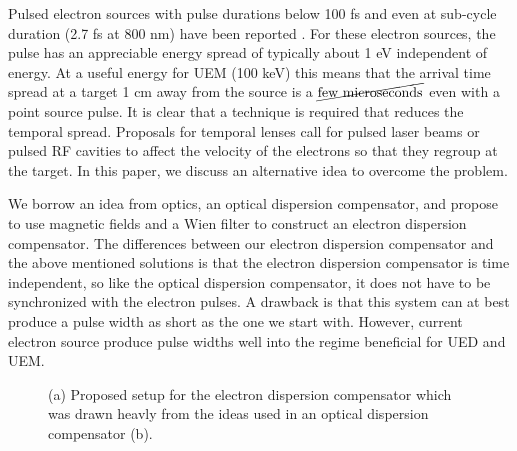 \documentclass[12pt,letterpaper]{article}
\begin{document}
Pulsed electron sources with pulse durations below 100 fs \cite{Bat} and even at sub-cycle duration (2.7 fs at 800 nm) have been reported \cite{Kasevich,Hommelhof}.  
For these electron sources, the pulse has an appreciable energy spread of typically about 1 eV independent of energy. 
At a useful energy for UEM (100 keV) this means that the arrival time spread at a target 1 cm away from the source is a $\cancel{\text{few microseconds}}$ even with a point source pulse. 
It is clear that a technique is required that reduces the temporal spread. 
Proposals for temporal lenses call for pulsed laser beams \cite{PNAS} or pulsed RF cavities \cite{Kraus} to affect the velocity of the electrons so that they regroup at the target. 
In this paper, we discuss an alternative idea to overcome the problem.

We borrow an idea from optics, an optical dispersion compensator, and propose to use magnetic fields and a Wien filter to construct an  electron dispersion compensator. 
The differences between our electron dispersion compensator and the above mentioned solutions \cite{PNAS,Kraus} is that the electron dispersion compensator is time independent, so like the optical dispersion compensator, it does not have to be synchronized with the electron pulses. 
A drawback is that this system can at best produce a pulse width as short as the one we start with. 
However, current electron source produce pulse widths well into the regime beneficial for UED and UEM. \cite{Kraus}

\begin{figure}[tb]
   \centering
   \hspace{4mm}
   \caption{(a) Proposed setup for the electron dispersion compensator which was drawn heavly from the ideas used in an optical dispersion compensator (b).}
\end{figure}
\end{document}
